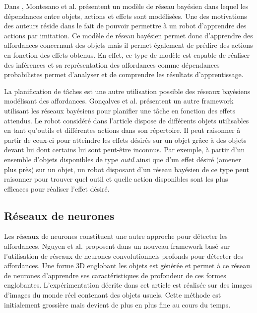 \documentclass{llncs}
\begin{document}
Dans \cite{Montesano2008}, Montesano et al. présentent un modèle de réseau bayésien dans lequel les dépendances entre objets, actions et effets sont modélisées.
Une des motivations des auteurs réside dans le fait de pouvoir permettre à un robot d'apprendre des actions par imitation.
Ce modèle de réseau bayésien permet donc d'apprendre des affordances concernant des objets mais il permet également de prédire des actions en fonction des effets obtenus.
En effet, ce type de modèle est capable de réaliser des inférences et sa représentation des affordances comme dépendances probabilistes permet d'analyser et de comprendre les résultats d'apprentissage.

La planification de tâches est une autre utilisation possible des réseaux bayésiens modélisant des affordances.
Gonçalves et al. présentent un autre framework utilisant les réseaux bayésiens \cite{Goncalves2014} pour planifier une tâche en fonction des effets attendus.
Le robot considéré dans l'article dispose de différents objets utilisables en tant qu'outils et différentes actions dans son répertoire.
Il peut raisonner à partir de ceux-ci pour atteindre les effets désirés sur un objet grâce à des objets devant lui dont certains lui sont peut-être inconnus.
Par exemple, à partir d'un ensemble d'objets disponibles de type \textit{outil} ainsi que d'un effet désiré (amener plus près) sur un objet, un robot disposant d'un réseau bayésien de ce type peut raisonner pour trouver quel outil et quelle action disponibles sont les plus efficaces pour réaliser l'effet désiré.




\subsection{Réseaux de neurones}

Les réseaux de neurones constituent une autre approche pour détecter les affordances.
Nguyen et al. proposent dans \cite{Nguyen2017} un nouveau framework basé sur l'utilisation de réseaux de neurones convolutionnels profonds pour détecter des affordances.
Une forme 3D englobant les objets est générée et permet à ce réseau de neurones d'apprendre ses caractéristiques de profondeur de ces formes englobantes.
L'expérimentation décrite dans cet article est réalisée sur des images d'images du monde réel contenant des objets usuels.
Cette méthode est initialement grossière mais devient de plus en plus fine au cours du temps.
\end{document}
